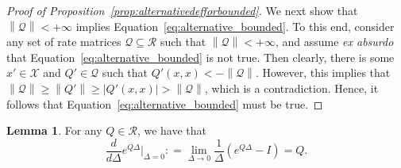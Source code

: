 \documentclass[10pt,a4paper]{paper}
\theoremstyle{definition}
\newtheorem{lemma}[theorem]{Lemma}
\newcommand{\states}{\mathcal{X}}
\newcommand{\rateset}{\mathcal{Q}}
\newcommand{\norm}[1]{\left\lVert #1 \right\rVert}
\newcommand{\abs}[1]{\left\vert #1 \right\vert}
\newcommand{\coloneqq}{:\!=}
\begin{document}
\begin{proof}[Proof of Proposition~\ref{prop:alternativedefforbounded}]
We next show that $\norm{\rateset}<+\infty$ implies Equation~\eqref{eq:alternative_bounded}. To this end, consider any set of rate matrices $\rateset\subseteq\mathcal{R}$ such that $\norm{\rateset}<+\infty$, and assume \emph{ex absurdo} that Equation~\eqref{eq:alternative_bounded} is not true. Then clearly, there is some $x'\in\states$ and $Q'\in\rateset$ such that $Q'(x,x)<-\norm{\rateset}$. However, this implies that $\norm{\rateset}\geq\norm{Q'}\geq\abs{Q'(x,x)}>\norm{\rateset}$, which is a contradiction. Hence, it follows that Equation~\eqref{eq:alternative_bounded} must be true.
\end{proof}

\begin{lemma}{\cite[Theorem 2.1.1]{norris1998markov}}\label{lemma:deriv_exponential_trans}
For any $Q\in\mathcal{R}$, we have that
\begin{equation*}
{\frac{d}{d \Delta}e^{Q\Delta}}\big\vert_{\Delta=0} \coloneqq \lim_{\Delta\to 0}\frac{1}{\Delta}(e^{Q\Delta}-I)= Q.
\end{equation*}
\end{lemma}
\end{document}
